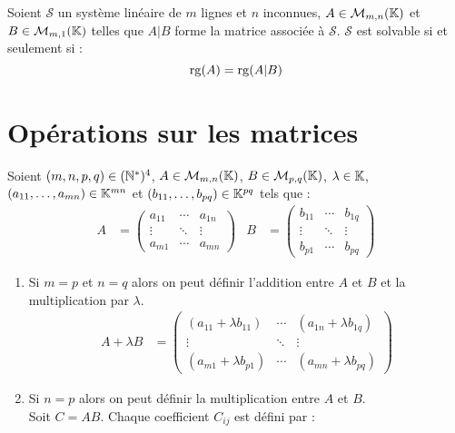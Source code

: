 \begin{theorem}
    Soient $\mathcal{S}$ un système linéaire de $m$ lignes et $n$ inconnues, $A \in \mathcal{M}_{m,n}(\mathbb{K})$ et $B \in \mathcal{M}_{m,1}(\mathbb{K})$ telles que $A|B$ forme la matrice associée à $\mathcal{S}$. $\mathcal{S}$ est solvable si et seulement si :
    \[ \operatorname{rg}(A) = \operatorname{rg}(A|B) \]
\end{theorem}

\section{Opérations sur les matrices}
\begin{definition}
	Soient $(m,n,p,q) \in (\mathbb{N}^*)^4$, $A \in \mathcal{M}_{m, n}(\mathbb{K})$, $B \in \mathcal{M}_{p, q}(\mathbb{K})$, $\lambda \in \mathbb{K}$, $(a_{11}, \ldots, a_{mn}) \in \mathbb{K}^{mn}$ et $(b_{11}, \ldots, b_{pq}) \in \mathbb{K}^{pq}$ tels que :
	\begin{align*}
		A &=
		\begin{pmatrix}
			a_{11} & \cdots & a_{1n} \\
			\vdots & \ddots & \vdots \\
			a_{m1} & \cdots & a_{mn}
		\end{pmatrix}
		&
		B &= 
		\begin{pmatrix}
			b_{11} & \cdots & b_{1q} \\
			\vdots & \ddots & \vdots \\
			b_{p1} & \cdots & b_{pq}
		\end{pmatrix}
	\end{align*}
	\begin{enumerate}
		\item Si $m = p$ et $n = q$ alors on peut définir l'addition entre $A$ et $ B$ et la multiplication par $\lambda$.
		\begin{align*}
			A + \lambda B &= 
			\begin{pmatrix}
				(a_{11} + \lambda b_{11}) & \cdots & (a_{1n} + \lambda b_{1q}) \\
				\vdots & \ddots & \vdots \\
				(a_{m1} + \lambda b_{p1}) & \cdots & (a_{mn} + \lambda b_{pq})
			\end{pmatrix}
		\end{align*}
		\item Si $n = p$ alors on peut définir la multiplication entre $A$ et $B$.\\
		Soit $C = AB$. Chaque coefficient $C_{ij}$ est défini par :
		\begin{align*}

\end{align*}
\end{enumerate}
\end{definition}
